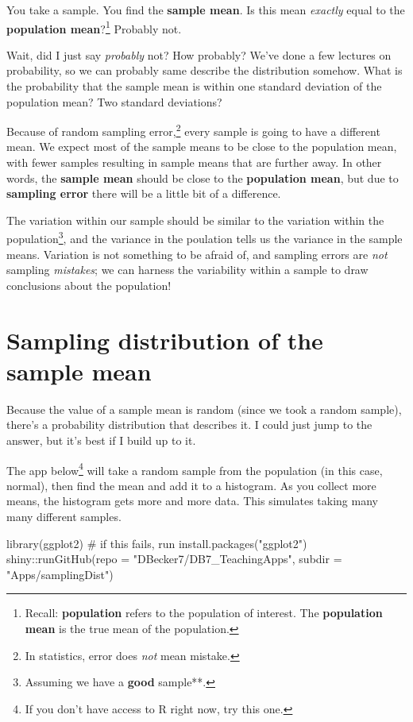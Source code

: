 \documentclass[
  letterpaper,
  DIV=11,
  numbers=noendperiod]{scrreprt}
\newenvironment{Shaded}{\begin{snugshade}}{\end{snugshade}}
\newcommand{\AttributeTok}[1]{\textcolor[rgb]{0.40,0.45,0.13}{#1}}
\newcommand{\CommentTok}[1]{\textcolor[rgb]{0.37,0.37,0.37}{#1}}
\newcommand{\FunctionTok}[1]{\textcolor[rgb]{0.28,0.35,0.67}{#1}}
\newcommand{\NormalTok}[1]{\textcolor[rgb]{0.00,0.23,0.31}{#1}}
\newcommand{\SpecialCharTok}[1]{\textcolor[rgb]{0.37,0.37,0.37}{#1}}
\newcommand{\StringTok}[1]{\textcolor[rgb]{0.13,0.47,0.30}{#1}}
\begin{document}
You take a sample. You find the \textbf{sample mean}. Is this mean
\emph{exactly} equal to the \textbf{population mean}?\footnote{Recall:
  \textbf{population} refers to the population of interest. The
  \textbf{population mean} is the true mean of the population.} Probably
not.

Wait, did I just say \emph{probably} not? How probably? We've done a few
lectures on probability, so we can probably same describe the
distribution somehow. What is the probability that the sample mean is
within one standard deviation of the population mean? Two standard
deviations?

Because of random sampling error,\footnote{In statistics, error does
  \emph{not} mean mistake.} every sample is going to have a different
mean. We expect most of the sample means to be close to the population
mean, with fewer samples resulting in sample means that are further
away. In other words, the \textbf{sample mean} should be close to the
\textbf{population mean}, but due to \textbf{sampling error} there will
be a little bit of a difference.

The variation within our sample should be similar to the variation
within the population\footnote{Assuming we have a \textbf{good}
  sample**.}, and the variance in the poulation tells us the variance in
the sample means. Variation is not something to be afraid of, and
sampling errors are \emph{not} sampling \emph{mistakes}; we can harness
the variability within a sample to draw conclusions about the
population!

\hypertarget{sampling-distribution-of-the-sample-mean}{%
\section{Sampling distribution of the sample
mean}\label{sampling-distribution-of-the-sample-mean}}

Because the value of a sample mean is random (since we took a random
sample), there's a probability distribution that describes it. I could
just jump to the answer, but it's best if I build up to it.

The app below\footnote{If you don't have access to R right now, try this
  one.} will take a random sample from the population (in this case,
normal), then find the mean and add it to a histogram. As you collect
more means, the histogram gets more and more data. This simulates taking
many many different samples.

\begin{Shaded}
\begin{Highlighting}[]
\FunctionTok{library}\NormalTok{(ggplot2) }\CommentTok{\# if this fails, run install.packages("ggplot2")}
\NormalTok{shiny}\SpecialCharTok{::}\FunctionTok{runGitHub}\NormalTok{(}\AttributeTok{repo =} \StringTok{"DBecker7/DB7\_TeachingApps"}\NormalTok{, }
    \AttributeTok{subdir =} \StringTok{"Apps/samplingDist"}\NormalTok{)}
\end{Highlighting}
\end{Shaded}
\end{document}
